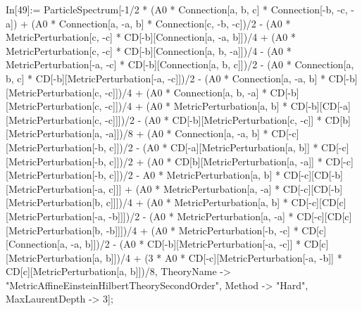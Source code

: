 In[49]:= ParticleSpectrum[-1/2 * (A0 * Connection[a, b, c] * Connection[-b, -c, -a]) + (A0 * Connection[a, -a, b] * Connection[c, -b, -c])/2 - (A0 * MetricPerturbation[c, -c] * CD[-b][Connection[a, -a, b]])/4 + (A0 * MetricPerturbation[c, -c] * CD[-b][Connection[a, b, -a]])/4 - (A0 * MetricPerturbation[-a, -c] * CD[-b][Connection[a, b, c]])/2 - (A0 * Connection[a, b, c] * CD[-b][MetricPerturbation[-a, -c]])/2 - (A0 * Connection[a, -a, b] * CD[-b][MetricPerturbation[c, -c]])/4 + (A0 * Connection[a, b, -a] * CD[-b][MetricPerturbation[c, -c]])/4 + (A0 * MetricPerturbation[a, b] * CD[-b][CD[-a][MetricPerturbation[c, -c]]])/2 - (A0 * CD[-b][MetricPerturbation[c, -c]] * CD[b][MetricPerturbation[a, -a]])/8 + (A0 * Connection[a, -a, b] * CD[-c][MetricPerturbation[-b, c]])/2 - (A0 * CD[-a][MetricPerturbation[a, b]] * CD[-c][MetricPerturbation[-b, c]])/2 + (A0 * CD[b][MetricPerturbation[a, -a]] * CD[-c][MetricPerturbation[-b, c]])/2 - A0 * MetricPerturbation[a, b] * CD[-c][CD[-b][MetricPerturbation[-a, c]]] + (A0 * MetricPerturbation[a, -a] * CD[-c][CD[-b][MetricPerturbation[b, c]]])/4 + (A0 * MetricPerturbation[a, b] * CD[-c][CD[c][MetricPerturbation[-a, -b]]])/2 - (A0 * MetricPerturbation[a, -a] * CD[-c][CD[c][MetricPerturbation[b, -b]]])/4 + (A0 * MetricPerturbation[-b, -c] * CD[c][Connection[a, -a, b]])/2 - (A0 * CD[-b][MetricPerturbation[-a, -c]] * CD[c][MetricPerturbation[a, b]])/4 + (3 * A0 * CD[-c][MetricPerturbation[-a, -b]] * CD[c][MetricPerturbation[a, b]])/8, TheoryName -> "MetricAffineEinsteinHilbertTheorySecondOrder", Method -> "Hard", MaxLaurentDepth -> 3]; 